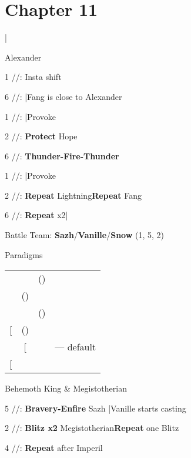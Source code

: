 \section{Chapter 11}

\begin{mainlist}
	\item {}|
\end{mainlist}
\begin{fight}{Alexander}
	\item [1] \rav/\med/\sen: Insta shift
	\item [6] \rav/\rav/\com: |Fang is close to Alexander
	\item [1] \rav/\med/\sen: |Provoke
	\item [2] \syn/\med/\sen: \textbf{Protect} Hope
	\item [6] \rav/\rav/\com: \textbf{Thunder-Fire-Thunder}
	\item [1] \rav/\med/\sen: |Provoke
	\item [2] \syn/\med/\sen: \textbf{Repeat} Lightning\to \textbf{Repeat} Fang
	\item [6] \rav/\rav/\com: \textbf{Repeat} x2|
\end{fight}
\begin{menu}
	\item Battle Team: \textbf{Sazh}/\textbf{Vanille}/\textbf{Snow} (1, 5, 2)
	\item Paradigms
	\begin{tabular}{cccl}
		\com       & \med       & (\com) &             \\
		\com       & (\sab)     & \rav   &             \\
		\syn       & \med       & (\com) &             \\
		{[}\com{]} & (\sab)     & \com   &             \\
		\syn       & {[}\sab{]} & \com   & --- default \\
		{[}\com{]} & \rav       & \com   &
	\end{tabular}
\end{menu}
\begin{fight}{Behemoth King \& Megistotherian}
	\item [5] \syn/\sab/\com: \textbf{Bravery-Enfire} Sazh |Vanille starts casting
	\item [2] \com/\sab/\rav: \textbf{Blitz x2} Megistotherian\to \textbf{Repeat} one Blitz
	\item [4] \com/\sab/\com: \textbf{Repeat} after Imperil
\end{fight}
